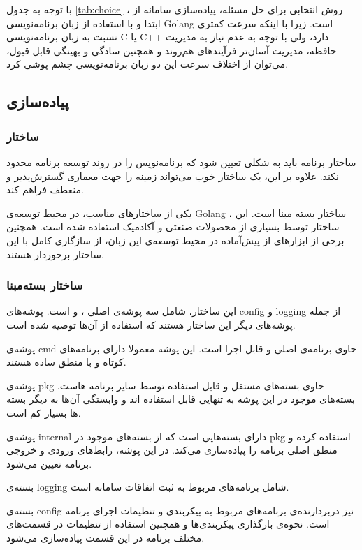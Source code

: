 با توجه به جدول
\ref{tab:choice}
، روش انتخابی برای حل مسئله،‌ پیاده‌سازی سامانه از ابتدا و با استفاده از زبان برنامه‌نویسی Golang است. زیرا با اینکه سرعت کمتری نسبت به زبان برنامه‌نویسی C یا C++ دارد، ولی با توجه به عدم نیاز به مدیریت حافظه، مدیریت آسان‌تر فرآیند‌های هم‌روند و همچنین سادگی و بهینگی قابل قبول،‌ می‌توان از اختلاف سرعت این دو زبان برنامه‌نویسی چشم پوشی کرد.

\subsection{پیاده‌سازی}\label{subsec:impl_impl}

\subsubsection{ساختار}
ساختار برنامه‌ باید به شکلی تعیین شود که برنامه‌نویس را در روند توسعه برنامه محدود نکند. علاوه بر این، یک ساختار خوب می‌تواند زمینه را جهت معماری گسترش‌پذیر و منعطف فراهم کند.

یکی از ساختار‌های مناسب، در محیط توسعه‌ی Golang ، ساختار بسته مبنا است. این ساختار توسط بسیاری از محصولات صنعتی و آکادمیک استفاده شده است. همچنین برخی از ابزار‌های از پیش‌آماده در محیط توسعه‌ی این زبان، از سازگاری کامل با این ساختار برخوردار هستند.

\subsubsection{ساختار بسته‌مبنا}
این ساختار، شامل سه پوشه‌ی اصلی ،  و  است. پوشه‌های config و logging از جمله پوشه‌های دیگر این ساختار هستند که استفاده از آن‌ها توصیه شده است.

پوشه‌ی cmd حاوی برنامه‌ی اصلی و قابل اجرا است. این پوشه معمولا دارای برنامه‌های کوتاه و با منطق ساده هستند.

پوشه‌ی pkg حاوی بسته‌های مستقل و قابل استفاده توسط سایر برنامه هاست. بسته‌های موجود در این پوشه به تنهایی قابل استفاده اند و وابستگی آن‌ها به دیگر بسته ها بسیار کم است.

پوشه‌ی internal دارای بسته‌هایی است که از بسته‌های موجود در pkg استفاده کرده و منطق اصلی برنامه را پیاده‌سازی می‌کند. در این پوشه، رابط‌های ورودی و خروجی برنامه تعیین می‌شود.

بسته‌ی logging شامل برنامه‌های مربوط به ثبت اتفاقات سامانه است.

بسته‌ی config نیز دربردارنده‌ی برنامه‌های مربوط به پیکربندی و تنظیمات اجرای برنامه است. نحوه‌ی بارگذاری پیکربندی‌ها و همچنین استفاده از تنظیمات در قسمت‌های مختلف برنامه در این قسمت پیاده‌سازی می‌شود.

